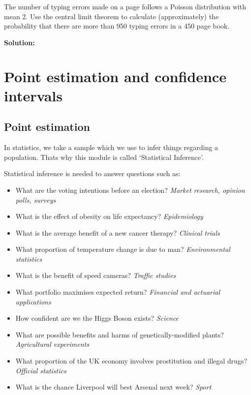 \documentclass[12pt]{article}
\newenvironment{example}[1][Example:]{\begin{trivlist}
\item[\hskip \labelsep {\bfseries #1}]}{\end{trivlist}}
\begin{document}
\begin{example}
The number of typing errors made on a page follows a Poisson distribution with mean 2. Use the central limit theorem to calculate (approximately) the probability that there are more than 950 typing errors in a 450 page book.
\end{example}
\begin{mdframed}
{\bf Solution:}
\textcolor[rgb]{1.00,1.00,1.00}{\lipsum[1-2]}
\end{mdframed}

\newpage
\section{Point estimation and confidence intervals}
\subsection{Point estimation}
In statistics, we take a sample which we use to infer things regarding a population. Thats why this module is called `Statistical Inference'.

Statistical inference is needed to answer questions such as:
\begin{itemize}
\item What are the voting intentions before an election? \emph{Market research, opinion
polls, surveys}
\item What is the effect of obesity on life expectancy? \emph{Epidemiology}
\item What is the average benefit of a new cancer therapy? \emph{Clinical trials}
\item What proportion of temperature change is due to man? \emph{Environmental
statistics}
\item What is the benefit of speed cameras? \emph{Traffic studies}
\item What portfolio maximises expected return? \emph{Financial and actuarial
applications}
\item How confident are we the Higgs Boson exists? \emph{Science}
\item What are possible benefits and harms of genetically-modified plants?
\emph{Agricultural experiments}
\item What proportion of the UK economy involves prostitution and illegal drugs?
\emph{Official statistics}
\item What is the chance Liverpool will best Arsenal next week? \emph{Sport}
\end{itemize}
\end{document}
